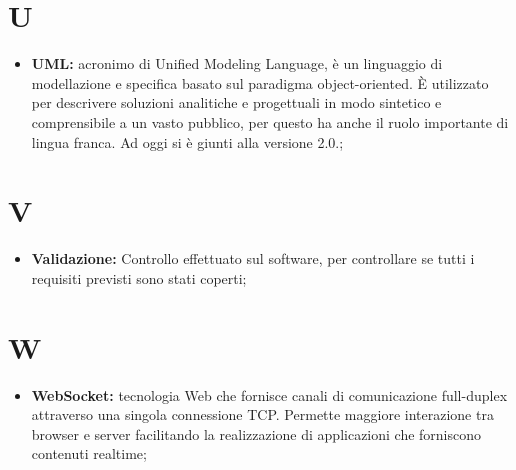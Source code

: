 %



\section*{U} %
\label{sec:u}
	\begin{itemize}
		\item \textbf{UML:} acronimo di Unified Modeling Language, è un linguaggio di modellazione e specifica basato sul paradigma object-oriented. È utilizzato per descrivere soluzioni analitiche e progettuali in modo sintetico e comprensibile a un vasto pubblico, per questo ha anche il ruolo importante di lingua franca. Ad oggi si è giunti alla versione 2.0.;
	\end{itemize}
\pagebreak

\section*{V} %
\label{sec:v}
	\begin{itemize}
		\item \textbf{Validazione:} Controllo effettuato sul software, per controllare se tutti i requisiti previsti sono stati coperti;
	\end{itemize}
\pagebreak

\section*{W} %
\label{sec:w}
	\begin{itemize}
		\item \textbf{WebSocket:} tecnologia Web che fornisce canali di comunicazione full-duplex attraverso una singola connessione TCP. Permette maggiore interazione tra browser e server facilitando la realizzazione di applicazioni che forniscono contenuti realtime;
	\end{itemize}
\pagebreak

